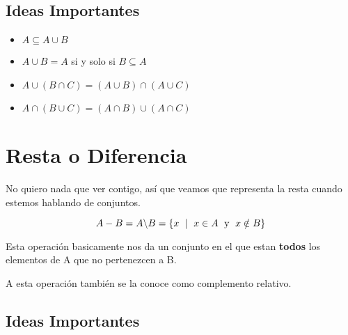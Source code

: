 \documentclass[12pt, fleqn]{report}                             %
\DeclareMathOperator \Space {\quad}                             %
\DeclareMathOperator \MiniSpace {\;}                            %
\newcommand \Such {\MiniSpace|\MiniSpace}                       %
\newcommand \Also {\MiniSpace \text{y} \MiniSpace}              %
\begin{document}
            \subsection{Ideas Importantes}

                \begin{itemize}
                    \item $A \subseteq A \cup B$

                    \item $A \cup B = A$ si y solo si $B \subseteq A$

                    \item $A \cup (B \cap C) = (A \cup B) \cap (A \cup C)$

                    \item $A \cap (B \cup C) = (A \cap B) \cup (A \cap C)$
                \end{itemize}




        \clearpage
        \section{Resta o Diferencia}

            No quiero nada que ver contigo, así que veamos que representa la resta cuando estemos
            hablando de conjuntos.

            \begin{equation}
                A - B = A \char`\\ B = \{ x \Such x \in A \Also  x \notin B \}
            \end{equation}

            Esta operación basicamente nos da un conjunto en el que estan \textbf{todos} los elementos
            de A que no pertenezcen a B.

            A esta operación también se la conoce como complemento relativo.

            \subsection{Ideas Importantes}
\end{document}

